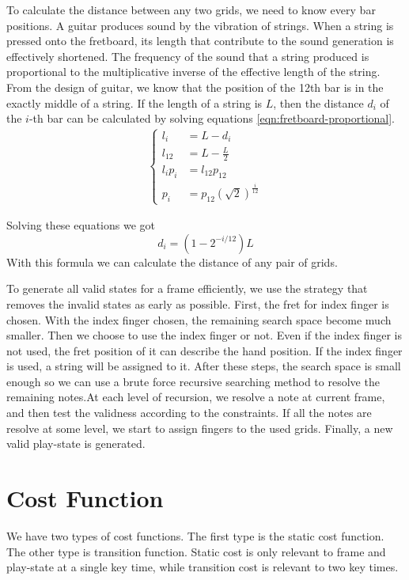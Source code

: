To calculate the distance between any two grids, we need to know every bar positions. A guitar produces sound by the vibration of strings. When a string is pressed onto the fretboard, its length that contribute to the sound generation is effectively shortened. The frequency of the sound that a string produced is proportional to the multiplicative inverse of the effective length of the string. From the design of guitar, we know that the position of the 12th bar is in the exactly middle of a string. If the length of a string is $L$, then the distance $d_i$ of the $i$-th bar can be calculated by solving equations \ref{eqn:fretboard-proportional}.
\begin{eqnarray}
    \left\{
    \begin{aligned}
        l_i &=  L - d_i \\
        l_{12} &=  L - \frac{L}{2} \\
        l_i p_i &=  l_{12} p_{12} \\
        p_i &=  p_{12} (\sqrt{2})^{ \frac{i}{12}}
    \end{aligned}
    \label{eqn:fretboard-proportional}
    \right.
\end{eqnarray}

Solving these equations we got \[ d_i = (1 - 2^{-i/12})L \]
With this formula we can calculate the distance of any pair of grids.

To generate all valid states for a frame efficiently, we use the strategy that removes the invalid states as early as possible. First, the fret for index finger is chosen. With the index finger chosen, the remaining search space become much smaller. Then we choose to use the index finger or not. Even if the index finger is not used, the fret position of it can describe the hand position. If the index finger is used, a string will be assigned to it. After these steps, the search space is small enough so we can use a brute force recursive searching method to resolve the remaining notes.At each level of recursion, we resolve a note at current frame, and then test the validness according to the constraints. If all the notes are resolve at some level, we start to assign fingers to the used grids. Finally, a new valid play-state is generated.

\section{Cost Function} \label{section:cost-function}
We have two types of cost functions. The first type is the static cost function. The other type is transition function. Static cost is only relevant to frame and play-state at a single key time, while transition cost is relevant to two key times. 

